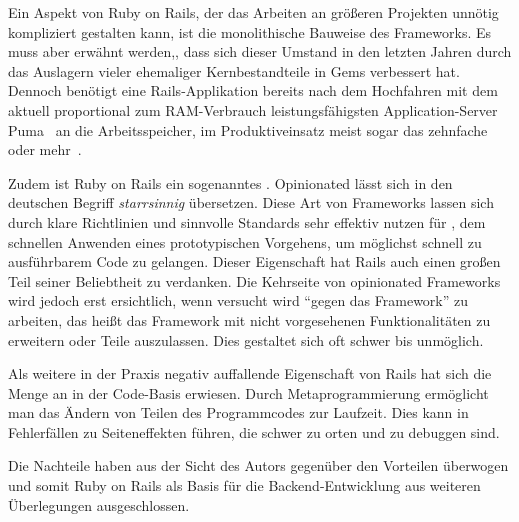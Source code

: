 Ein Aspekt von Ruby on Rails, der das Arbeiten an größeren Projekten unnötig
kompliziert gestalten kann, ist die monolithische Bauweise des Frameworks.  Es
muss aber erwähnt werden,, dass sich dieser Umstand in den letzten Jahren durch
das Auslagern vieler ehemaliger Kernbestandteile in Gems verbessert hat.
Dennoch benötigt eine Rails-Applikation bereits nach dem Hochfahren mit dem
aktuell proportional zum RAM-Verbrauch leistungsfähigsten Application-Server
Puma~\cite{puma} an die  Arbeitsspeicher, im Produktiveinsatz meist
sogar das zehnfache oder mehr~\cite{railsappservercomparison}.

Zudem ist Ruby on Rails ein sogenanntes .
Opinionated lässt sich in den deutschen Begriff \emph{starrsinnig} übersetzen.
Diese Art von Frameworks lassen sich durch klare Richtlinien und sinnvolle
Standards sehr effektiv nutzen für ,
dem schnellen Anwenden eines prototypischen Vorgehens, um möglichst schnell
zu ausführbarem Code zu gelangen.  Dieser Eigenschaft hat Rails auch einen
großen Teil seiner Beliebtheit zu verdanken.  Die Kehrseite von opinionated
Frameworks wird jedoch erst ersichtlich, wenn versucht wird \enquote{gegen das
Framework} zu arbeiten, das heißt das Framework mit nicht vorgesehenen
Funktionalitäten zu erweitern oder Teile auszulassen.  Dies gestaltet sich oft
schwer bis unmöglich.

Als weitere in der Praxis negativ auffallende Eigenschaft von Rails hat
sich die Menge an  in der Code-Basis erwiesen.
Durch Metaprogrammierung ermöglicht man das Ändern von Teilen des Programmcodes
zur Laufzeit. Dies kann in Fehlerfällen zu Seiteneffekten führen, die schwer zu
orten und zu debuggen sind.

Die Nachteile haben aus der Sicht des Autors gegenüber den Vorteilen überwogen
und somit Ruby on Rails als Basis für die Backend-Entwicklung aus weiteren
Überlegungen ausgeschlossen.
